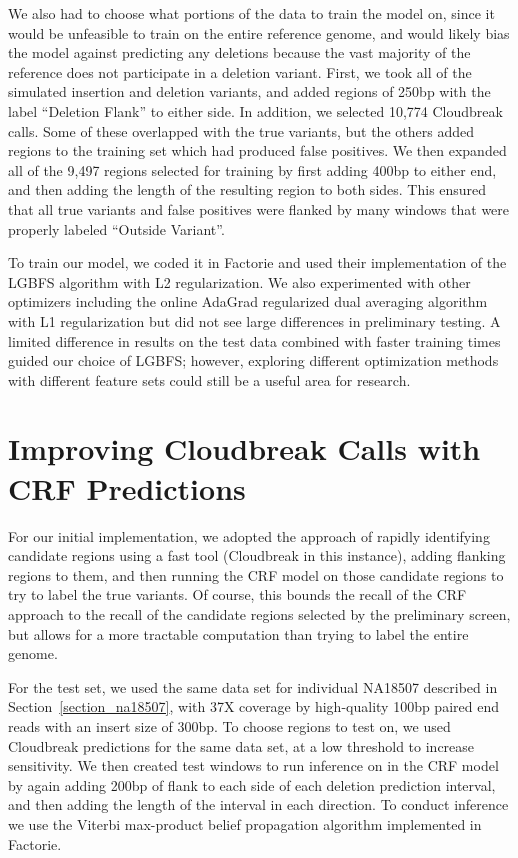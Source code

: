 We also had to choose what portions of the data to train the model on, since it would be unfeasible to train on the entire reference genome, and would likely bias the model against predicting any deletions because the vast majority of the reference does not participate in a deletion variant. First, we took all of the simulated insertion and deletion variants, and added regions of 250bp with the label ``Deletion Flank'' to either side. In addition, we selected 10,774 Cloudbreak calls. Some of these overlapped with the true variants, but the others added regions to the training set which had produced false positives. We then expanded all of the 9,497 regions selected for training by first adding 400bp to either end, and then adding the length of the resulting region to both sides. This ensured that all true variants and false positives were flanked by many windows that were properly labeled ``Outside Variant''.

To train our model, we coded it in Factorie and used their implementation of the LGBFS algorithm with L2 regularization. We also experimented with other optimizers including the online AdaGrad regularized dual averaging algorithm \cite{Duchi:2011:ASM:1953048.2021068} with L1 regularization but did not see large differences in preliminary testing. A limited difference in results on the test data combined with faster training times guided our choice of LGBFS; however, exploring different optimization methods with different feature sets could still be a useful area for research.

\section{Improving Cloudbreak Calls with CRF Predictions}

For our initial implementation, we adopted the approach of rapidly identifying candidate regions using a fast tool (Cloudbreak in this instance), adding flanking regions to them, and then running the CRF model on those candidate regions to try to label the true variants. Of course, this bounds the recall of the CRF approach to the recall of the candidate regions selected by the preliminary screen, but allows for a more tractable computation than trying to label the entire genome.

For the test set, we used the same data set for individual NA18507 described in Section~\ref{section_na18507}, with 37X coverage by high-quality 100bp paired end reads with an insert size of 300bp. To choose regions to test on, we used Cloudbreak predictions for the same data set, at a low threshold to increase sensitivity.  We then created test windows to run inference on in the CRF model by again adding 200bp of flank to each side of each deletion prediction interval, and then adding the length of the interval in each direction. To conduct inference we use the Viterbi max-product belief propagation algorithm implemented in Factorie.


